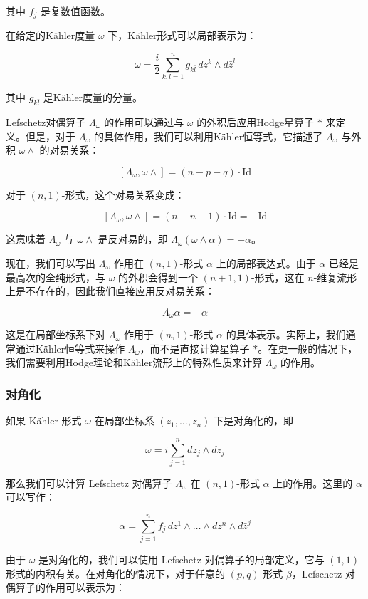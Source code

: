 其中 \(f_j\) 是复数值函数。

在给定的Kähler度量 \(\omega\) 下，Kähler形式可以局部表示为：

\[
\omega = \frac{i}{2} \sum_{k,l=1}^{n} g_{k\bar{l}} \, dz^k \wedge d\bar{z}^l
\]

其中 \(g_{k\bar{l}}\) 是Kähler度量的分量。

Lefschetz对偶算子 \(\Lambda_\omega\) 的作用可以通过与 \(\omega\) 的外积后应用Hodge星算子 \(\ast\) 来定义。但是，对于 \(\Lambda_\omega\) 的具体作用，我们可以利用Kähler恒等式，它描述了 \(\Lambda_\omega\) 与外积 \(\omega \wedge\) 的对易关系：

\[
[\Lambda_\omega, \omega \wedge] = (n - p - q) \cdot \text{Id}
\]

对于 \((n, 1)\)-形式，这个对易关系变成：

\[
[\Lambda_\omega, \omega \wedge] = (n - n - 1) \cdot \text{Id} = -\text{Id}
\]

这意味着 \(\Lambda_\omega\) 与 \(\omega \wedge\) 是反对易的，即 \(\Lambda_\omega(\omega \wedge \alpha) = -\alpha\)。

现在，我们可以写出 \(\Lambda_\omega\) 作用在 \((n, 1)\)-形式 \(\alpha\) 上的局部表达式。由于 \(\alpha\) 已经是最高次的全纯形式，与 \(\omega\) 的外积会得到一个 \((n+1, 1)\)-形式，这在 \(n\)-维复流形上是不存在的，因此我们直接应用反对易关系：

\[
\Lambda_\omega \alpha = -\alpha
\]

这是在局部坐标系下对 \(\Lambda_\omega\) 作用于 \((n, 1)\)-形式 \(\alpha\) 的具体表示。实际上，我们通常通过Kähler恒等式来操作 \(\Lambda_\omega\)，而不是直接计算星算子 \(\ast\)。在更一般的情况下，我们需要利用Hodge理论和Kähler流形上的特殊性质来计算 \(\Lambda_\omega\) 的作用。


\subsubsection{对角化}
如果 Kähler 形式 \(\omega\) 在局部坐标系 \((z_1, \ldots, z_n)\) 下是对角化的，即

\[
\omega = i \sum_{j=1}^{n} dz_j \wedge d\bar{z}_j
\]

那么我们可以计算 Lefschetz 对偶算子 \(\Lambda_\omega\) 在 \((n, 1)\)-形式 \(\alpha\) 上的作用。这里的 \(\alpha\) 可以写作：

\[
\alpha = \sum_{j=1}^{n} f_j \, dz^1 \wedge \ldots \wedge dz^n \wedge d\bar{z}^j
\]

由于 \(\omega\) 是对角化的，我们可以使用 Lefschetz 对偶算子的局部定义，它与 \((1,1)\)-形式的内积有关。在对角化的情况下，对于任意的 \((p,q)\)-形式 \(\beta\)，Lefschetz 对偶算子的作用可以表示为：


